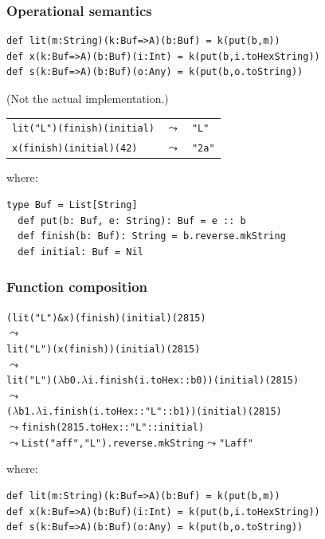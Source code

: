 \documentclass[14pt,t,usepdftitle=false,
xcolornames=x11names,svgnames,dvipsnames]{beamer}
\begin{document}
\begin{frame}[fragile]
  \frametitle{Operational semantics}
\begin{lstlisting}[style=scala,moreemph={Buf}]
def lit(m:String)(k:Buf=>A)(b:Buf) = k(put(b,m))
def x(k:Buf=>A)(b:Buf)(i:Int) = k(put(b,i.toHexString))
def s(k:Buf=>A)(b:Buf)(o:Any) = k(put(b,o.toString))
\end{lstlisting}
  {\vskip-3mm\footnotesize\hfill(Not the actual implementation.)}
  \begin{center}
  \begin{tabular}[t]{l@{~}c@{~}l}
    \lstinline!lit("L")(finish)(initial)!
    &$\leadsto$& \lstinline!"L"!\\
    \lstinline!x(finish)(initial)(42)!
    &$\leadsto$& \lstinline!"2a"!
  \end{tabular}
  \end{center}
where:
\begin{lstlisting}[style=scala,moreemph={Buf}]
  type Buf = List[String]
  def put(b: Buf, e: String): Buf = e :: b
  def finish(b: Buf): String = b.reverse.mkString
  def initial: Buf = Nil
\end{lstlisting}
\end{frame}

\begin{frame}[fragile]
  \frametitle{Function composition}
  \begin{alltt}\small
 (lit("L") \verb+&+ x) (finish) (initial) (2815)
\(\leadsto\)
 lit("L")(x(finish)) (initial) (2815)
\(\leadsto\)
 lit("L")(\(\lambda\)b0.\(\lambda\)i.finish(i.toHex :: b0)) (initial) (2815)
\(\leadsto\)
 (\(\lambda\)b1.\(\lambda\)i.finish(i.toHex :: "L" :: b1)) (initial) (2815)
    \(\leadsto\) finish(2815.toHex :: "L" :: initial)
        \(\leadsto\) List("aff","L").reverse.mkString \(\leadsto\) "Laff"
\end{alltt}
\vskip-5mm
where:
\begin{lstlisting}[style=scala,moreemph={Buf}]
def lit(m:String)(k:Buf=>A)(b:Buf) = k(put(b,m))
def x(k:Buf=>A)(b:Buf)(i:Int) = k(put(b,i.toHexString))
def s(k:Buf=>A)(b:Buf)(o:Any) = k(put(b,o.toString))
\end{lstlisting}
\end{frame}
\end{document}
